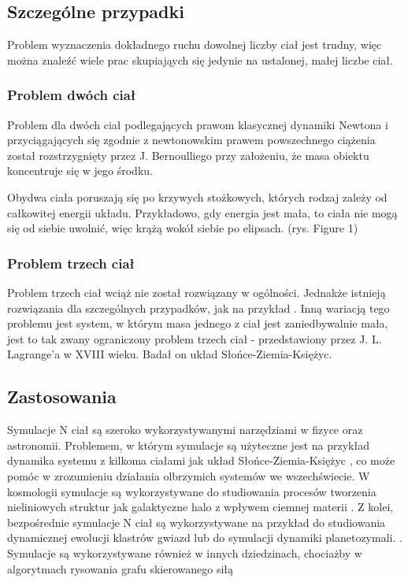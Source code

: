 \documentclass[14pt,twoside,a4paper]{article}
\begin{document}
\subsection{\Large Szczególne przypadki}
\bigskip
Problem wyznaczenia dokładnego ruchu dowolnej liczby ciał jest trudny, więc można znaleźć wiele prac skupiająych się jedynie na ustalonej, małej liczbe ciał.

\subsubsection{Problem dwóch ciał}
Problem dla dwóch ciał podlegających prawom klasycznej dynamiki Newtona i przyciągających się zgodnie z newtonowskim prawem powszechnego ciążenia został rozstrzygnięty przez J. Bernoulliego przy założeniu, że masa obiektu koncentruje się w jego środku. \cite{fund}

Obydwa ciała poruszają się po krzywych stożkowych, których rodzaj zależy od całkowitej energii układu. Przykładowo, gdy energia jest mała, to ciała nie mogą się od siebie uwolnić, więc krążą wokół siebie po elipsach. (rys. Figure 1)

\subsubsection{Problem trzech ciał}
Problem trzech ciał wciąż nie został rozwiązany w ogólności. Jednakże istnieją rozwiązania dla szczególnych przypadków, jak na przykład \cite{threebody1, threebody2}. Inną wariacją tego problemu jest system, w którym masa jednego z ciał jest zaniedbywalnie mała, jest to tak zwany ograniczony problem trzech ciał - przedstawiony przez J. L. Lagrange'a w XVIII wieku. Badał on układ Słońce-Ziemia-Księżyc. 


\subsection{\Large Zastosowania}
\bigskip
Symulacje N ciał są szeroko wykorzystywanymi narzędziami w fizyce oraz astronomii. Problemem, w którym symulacje są użyteczne jest na przykład dynamika systemu z kilkoma ciałami jak układ Słońce-Ziemia-Księżyc \cite{SEMmisc}, co może pomóc w zrozumieniu działania olbrzymich systemów we wszechświecie. \cite{chaosMisc}
W kosmologii symulacje są wykorzystywane do studiowania procesów tworzenia nieliniowych struktur jak galaktyczne halo z wpływem ciemnej materii \cite{haloDensity}. 
Z kolei, bezpośrednie symulacje N ciał są wykorzystywane na przykład do studiowania dynamicznej ewolucji klastrów gwiazd lub do symulacji dynamiki planetozymali. \cite{dirNBody}. Symulacje są wykorzystywane również w innych dziedzinach, chociażby w algorytmach rysowania grafu skierowanego siłą \cite{visGraph}
\newpage
\end{document}

